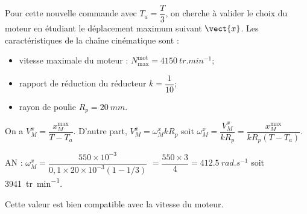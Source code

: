 \else
\fi

\ifprof
\else
Pour cette nouvelle commande avec $T_a=\dfrac{T}{3}$, on cherche à valider le choix du moteur en étudiant le
déplacement maximum suivant $\vect{x}$. Les caractéristiques de la chaîne cinématique sont :
\begin{itemize}
\item vitesse maximale du moteur : $N_{\text{max}}^{\text{mot}}=\SI{4150}{tr.min^{-1}}$;
\item rapport de réduction du réducteur $k=\dfrac{1}{10}$;
\item rayon de poulie $R_p= \SI{20}{mm}$.
\end{itemize}
\fi

\ifprof
On a  $V_M^x=\dfrac{x_M^{\text{max}}}{T-T_a}$. D'autre part, 
$V_M^x = \omega_M^x  k R_p $ soit $\omega_M^x  = \dfrac{V_M^x}{ k R_p} =  \dfrac{{x_M^{\text{max}}}}{ k R_p\left({T-T_a} \right)} $.

AN : $\omega_M^x  = \dfrac{550\times 10^{-3}}{ 0,1 \times 20 \times 10^{-3} \left(1-1/3 \right)} $
$ =  \dfrac{550\times 3}{ 4}= \SI{412,5}{rad.s^{-1}} $ soit \SI{3941}{tr.min^{-1}}.

Cette valeur est bien compatible avec la vitesse du moteur.
\else
\fi


\ifprof
\else


\fi